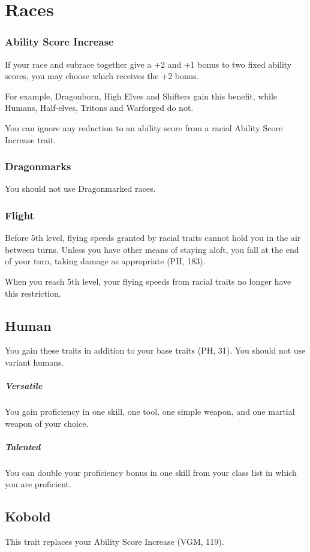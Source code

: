 \documentclass[letterpaper,twocolumn,openany,nodeprecatedcode]{dndbook}
\begin{document}
\section{Races}

\subsubsection{Ability Score Increase}
If your race and subrace together give a +2 and +1 bonus to two fixed ability scores, you may choose which receives the +2 bonus.

For example, Dragonborn, High Elves and Shifters gain this benefit, while Humans, Half-elves, Tritons and Warforged do not.

You can ignore any reduction to an ability score from a racial Ability Score Increase trait.

\subsubsection{Dragonmarks} You should not use Dragonmarked races.

\subsubsection{Flight} Before 5th level, flying speeds granted by racial traits cannot hold you in the air between turns. Unless you have other means of staying aloft, you fall at the end of your turn, taking damage as appropriate (PH, 183).

When you reach 5th level, your flying speeds from racial traits no longer have this restriction.

\subsection{Human}
You gain these traits in addition to your base traits (PH, 31). You should not use variant humans.

\subparagraph{Versatile} You gain proficiency in one skill, one tool, one simple weapon, and one martial weapon of your choice.
\subparagraph{Talented} You can double your proficiency bonus in one skill from your class list in which you are proficient.

\subsection{Kobold}
This trait replaces your Ability Score Increase (VGM, 119).
\end{document}
